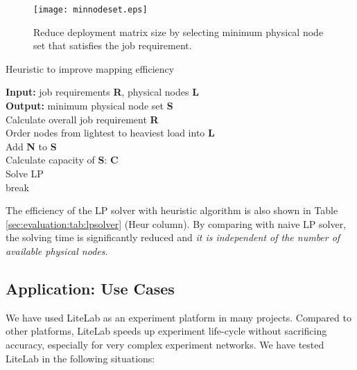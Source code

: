 \documentclass[conference]{IEEEtran}
\begin{document}
\begin{figure}[!tb]
  \centering
  \texttt{[image: minnodeset.eps]}
  \caption{Reduce deployment matrix size by selecting minimum physical
    node set that satisfies the job requirement.}
  \label{sec:evaluation:fig:mininodeset}
\end{figure}

\begin{algorithm}[!tb]
  \caption{Heuristic to improve mapping efficiency}
  \label{alg:mapping:heur}
  {\textbf{Input:} job requirements \textbf{R}, physical nodes \textbf{L}} \\
  {\textbf{Output:} minimum physical node set \textbf{S}} \\
Calculate overall job requirement \textbf{R} \\
  Order nodes from lightest to heaviest load into \textbf{L} \\
   {
    Add \textbf{N} to \textbf{S} \\
    Calculate capacity of \textbf{S}: \textbf{C} \\
     {
      Solve LP \\
       {
        break \\
      } \lElse {  } } }
\end{algorithm}

The efficiency of the LP solver with heuristic algorithm is also shown
in Table \ref{sec:evaluation:tab:lpsolver} (Heur column). By comparing
with naive LP solver, the solving time is significantly reduced and
\textit{it is independent of the number of available physical nodes}.










\subsection{Application: Use Cases}
\label{sec:evaluation:usecase}

We have used LiteLab as an experiment platform in many
projects. Compared to other platforms, LiteLab speeds up experiment
life-cycle without sacrificing accuracy, especially for very complex
experiment networks. We have tested LiteLab in the following
situations:
\end{document}
